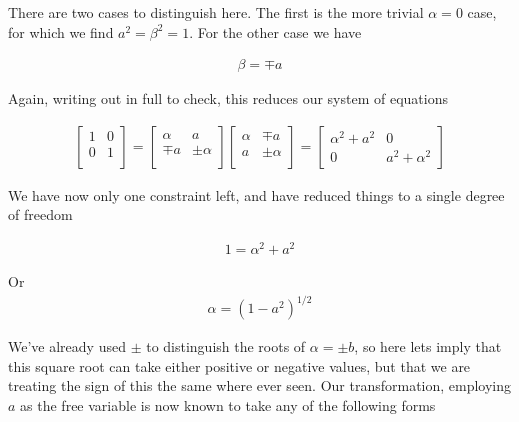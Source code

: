 There are two cases to distinguish here.  The first is the more trivial $\alpha = 0$ case, for which we find $a^2 = \beta^2 = 1$.  For the other case we have

\begin{align}\label{eqn:quadratricForm:voo13}
\beta = \mp a
\end{align}

Again, writing out in full to check, this reduces our system of equations

\begin{align}\label{eqn:quadratricForm:voo14}
\begin{bmatrix}
1 & 0 \\
0 & 1 \\
\end{bmatrix}
=
\begin{bmatrix}
\alpha & a     \\
\mp a  & \pm \alpha \\
\end{bmatrix}
\begin{bmatrix}
\alpha & \mp a \\
a      & \pm \alpha \\
\end{bmatrix}
= 
\begin{bmatrix}
\alpha^2 + a^2 & 0 \\
0 & a^2 + \alpha^2
\end{bmatrix}
\end{align}

We have now only one constraint left, and have reduced things to a single degree of freedom

\begin{align}\label{eqn:quadratricForm:voo15}
1 = \alpha^2 + a^2 
\end{align}

Or
\begin{align}\label{eqn:quadratricForm:voo16}
\alpha = (1 - a^2)^{1/2}
\end{align}

We've already used $\pm$ to distinguish the roots of $\alpha = \pm b$, so here lets imply that this square root can take either positive or negative values, but that we are treating the sign of this the same where ever seen.  Our transformation, employing $a$ as the free variable is now known to take any of the following forms

